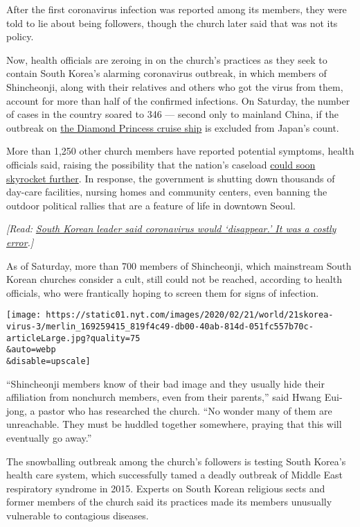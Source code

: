 After the first coronavirus infection was reported among its members,
they were told to lie about being followers, though the church later
said that was not its policy.

Now, health officials are zeroing in on the church's practices as they
seek to contain South Korea's alarming coronavirus outbreak, in which
members of Shincheonji, along with their relatives and others who got
the virus from them, account for more than half of the confirmed
infections. On Saturday, the number of cases in the country soared to
346 --- second only to mainland China, if the outbreak on
\href{https://www.nytimes.com/2020/02/19/world/asia/japan-cruise-ship-coronavirus.html}{the
Diamond Princess cruise ship} is excluded from Japan's count.

More than 1,250 other church members have reported potential symptoms,
health officials said, raising the possibility that the nation's
caseload
\href{http://www.nytimes.com/2020/02/25/world/asia/daegu-south-korea-coronavirus.html}{could
soon skyrocket further}. In response, the government is shutting down
thousands of day-care facilities, nursing homes and community centers,
even banning the outdoor political rallies that are a feature of life in
downtown Seoul.

\emph{{[}Read:}
\href{http://www.nytimes.com/2020/02/27/world/asia/coronavirus-south-korea.html}{\emph{South
Korean leader said coronavirus would `disappear.' It was a costly
error}}\emph{.{]}}

As of Saturday, more than 700 members of Shincheonji, which mainstream
South Korean churches consider a cult, still could not be reached,
according to health officials, who were frantically hoping to screen
them for signs of infection.

\texttt{[image: https://static01.nyt.com/images/2020/02/21/world/21skorea-virus-3/merlin\_169259415\_819f4c49-db00-40ab-814d-051fc557b70c-articleLarge.jpg?quality=75\\\&auto=webp\\\&disable=upscale]}

``Shincheonji members know of their bad image and they usually hide
their affiliation from nonchurch members, even from their parents,''
said Hwang Eui-jong, a pastor who has researched the church. ``No wonder
many of them are unreachable. They must be huddled together somewhere,
praying that this will eventually go away.''

The snowballing outbreak among the church's followers is testing South
Korea's health care system, which successfully tamed a deadly outbreak
of Middle East respiratory syndrome in 2015. Experts on South Korean
religious sects and former members of the church said its practices made
its members unusually vulnerable to contagious diseases.

